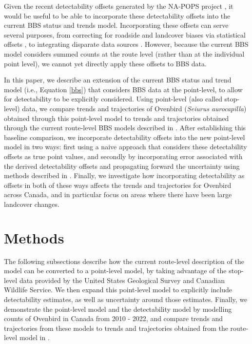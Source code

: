 \documentclass[12pt]{article}
\begin{document}
Given the recent detectability offsets generated by the NA-POPS project \citep{edwards_point_2023}, it would be useful to be able to incorporate these detectability offsets into the current BBS status and trends model. 
Incorporating these offsets can serve several purposes, from correcting for roadside and landcover biases via statistical offsets \citep{thogmartin_sensitivity_2010, solymos_lessons_2020, edwards_point_2023}, to integrating disparate data sources \citep{solymos_calibrating_2013, edwards_point_2023}. 
However, because the current BBS model considers summed counts at the route level (rather than at the individual point level), we cannot yet directly apply these offsets to BBS data. 

\par In this paper, we describe an extension of the current BBS status and trend model (i.e., Equation \ref{bbs}) that considers BBS data at the point-level, to allow for detectability to be explicitly considered. 
Using point-level (also called stop-level) data, we compare trends and trajectories of Ovenbird (\textit{Seiurus aurocapilla}) obtained through this point-level model to trends and trajectories obtained through the current route-level BBS models described in \citet{smith_spatially_2023}.
After establishing this baseline comparison, we incorporate detectability offsets into the new point-level model in two ways: first using a naive approach that considers these detectability offsets as true point values, and secondly by incorporating error associated with the derived detectability offsets and propagating forward the uncertainty using methods described in \citet{bravington_variance_2021}.
Finally, we investigate how incorporating detectability as offsets in both of these ways affects the trends and trajectories for Ovenbird across Canada, and in particular focus on areas where there have been large landcover changes.

\section{Methods}

\par The following subsections describe how the current route-level description of the model can be converted to a point-level model, by taking advantage of the stop-level data provided by the United States Geological Survey and Canadian Wildlife Service. 
We then expand this point-level model to explicitly include detectability estimates, as well as uncertainty around those estimates. 
Finally, we demonstrate the point-level model and the detectability model by modelling counts of Ovenbird in Canada from 2010 - 2022, and compare trends and trajectories from these models to trends and trajectories obtained from the route-level model in \citet{smith_spatially_2023}.
\end{document}
